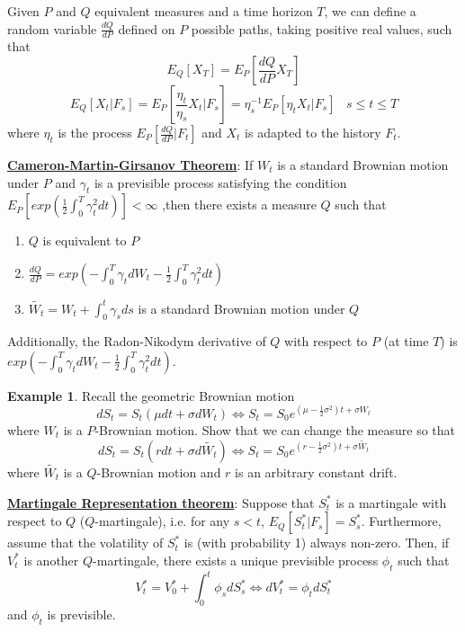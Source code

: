 \documentclass[11pt,a4paper]{book}
\theoremstyle{definition}\newtheorem{definition}{Definition}
\theoremstyle{definition}\newtheorem{fact}{Fact}
\theoremstyle{definition}\newtheorem{remark}{Remark}
\theoremstyle{definition}\newtheorem{ex}{Ex.}
\theoremstyle{definition}\newtheorem{project}{Project}
\theoremstyle{definition}\newtheorem{problem}{Problem}
\theoremstyle{definition}\newtheorem{example}{Example}
\numberwithin{theorem}{section}
\numberwithin{corollary}{chapter}
\numberwithin{assumption}{chapter}
\numberwithin{definition}{chapter}
\numberwithin{prop}{chapter}
\numberwithin{notation}{chapter}
\numberwithin{problem}{chapter}
\numberwithin{example}{chapter}
\numberwithin{fact}{chapter}
\numberwithin{ex}{chapter}
\begin{document}
Given $P$ and $Q$ equivalent measures and a time horizon $T$, we can define a random variable $\frac{dQ}{dP}$ defined on $P$ possible paths, taking positive real values, such that
$$ E_Q[X_T] = E_P \left[ \frac{dQ}{dP} X_T \right] $$
$$ E_Q[X_t | F_s] = E_P \left[ \frac{\eta_t}{\eta_s}X_t | F_s \right] = \eta_s^{-1} E_P[\eta_t X_t | F_s] \,\,\,\,\,s \leq t \leq T $$
where $\eta_t$ is the process $E_P[\frac{dQ}{dP} | F_t]$ and $X_t$ is adapted to the history $F_t$.

\textbf{\underline{Cameron-Martin-Girsanov Theorem}}: If $W_t$ is a standard Brownian motion under $P$ and $\gamma_t$ is a previsible process satisfying the condition $E_P[exp(\frac{1}{2} \int_0^T \gamma_t^2 dt)] < \infty$ ,then there exists a measure $Q$ such that
\begin{enumerate}[label=(\roman*)]
\item $Q$ is equivalent to $P$
\item $\frac{dQ}{dP} = exp \left( -\int_0^T \gamma_t dW_t - \frac{1}{2} \int_0^T \gamma_t^2 dt \right)$
\item $\tilde{W_t} = W_t + \int_0^t \gamma_s ds$ is a standard Brownian motion under $Q$
\end{enumerate}
Additionally, the Radon-Nikodym derivative of $Q$ with respect to $P$ (at time $T$) is $exp(-\int_0^T \gamma_t dW_t - \frac{1}{2}\int_0^T \gamma_t^2 dt)$.

\begin{example}
Recall the geometric Brownian motion
$$ dS_t = S_t(\mu dt + \sigma dW_t) \Longleftrightarrow S_t = S_0 e^{(\mu-\frac{1}{2}\sigma^2)t + \sigma W_t} $$
where $W_t$ is a $P$-Brownian motion. Show that we can change the measure so that
$$ dS_t = S_t(r dt + \sigma d\tilde{W_t}) \Longleftrightarrow S_t = S_0 e^{(r-\frac{1}{2}\sigma^2)t + \sigma \tilde{W_t}} $$
where $\tilde{W_t}$ is a $Q$-Brownian motion and $r$ is an arbitrary constant drift.
\end{example}

\textbf{\underline{Martingale Representation theorem}}: Suppose that $S_t^*$ is a martingale with respect to $Q$ ($Q$-martingale), i.e. for any $s<t$, $E_Q[S_t^* | F_s] = S_s^*$. Furthermore, assume that the volatility of $S_t^*$ is (with probability 1) always non-zero. Then, if $V_t^*$ is another $Q$-martingale, there exists a unique previsible process $\phi_t$ such that
$$ V_t^* = V_0^* + \int_0^t \phi_s dS_s^* \Longleftrightarrow dV_t^* = \phi_t dS_t^* $$
and $\phi_t$ is previsible.
\end{document}
